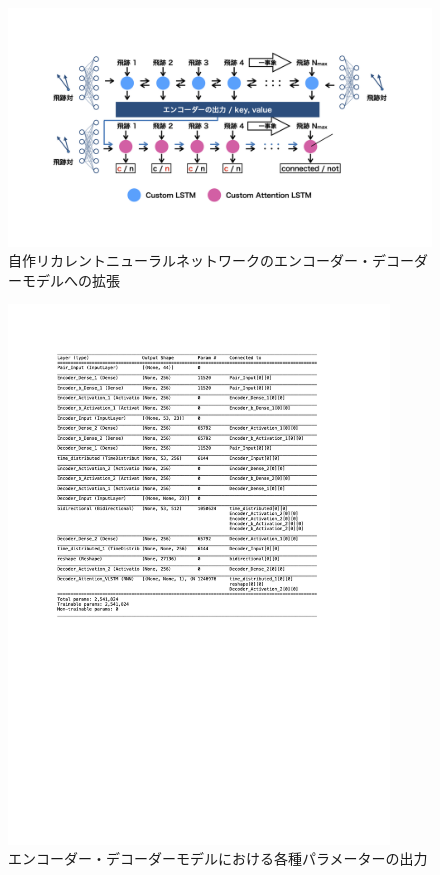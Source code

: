\begin{figure}[h]
 \centering
 \includegraphics[width=1.0\textwidth]{Figure/3Networks/3-4-1-2EncoderDecoderVLSTM.png}
 \caption{自作リカレントニューラルネットワークのエンコーダー・デコーダーモデルへの拡張}
 \label{3-4-1-2EncoderDecoderVLSTM.png}
\end{figure}

\begin{figure}[h]
 \centering
 \includegraphics[trim = 0 200 0 200, width=0.9\textwidth]{Figure/3Networks/3-4-1-3VLSTMSummary.png}
 \caption{エンコーダー・デコーダーモデルにおける各種パラメーターの出力}
 \label{3-4-1-3VLSTMSummary}
\end{figure}


